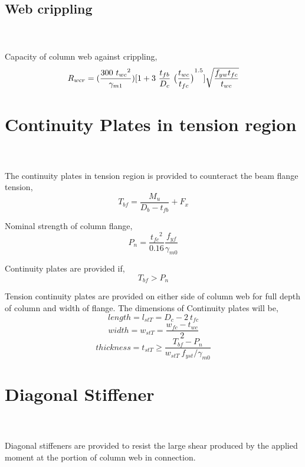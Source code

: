 \documentclass[11.5pt,a4paper,oneside]{report}
\begin{document}
\begin{Form}
\subsection{Web crippling}
\qquad {} \\ \\
\noindent
Capacity of column web against crippling,
\begin{equation}
R_{wcr} = (\frac{300~ {t_{wc}}^2}{\gamma_{m1}})
[1+3~\frac{t_{fb}}{D_c} ~ {\big{(}\frac{t_{wc}}{t_{fc}}\big{)}}^{1.5}]
\sqrt{\frac{f_{yw} t_{fc}}{t_{wc}}}
\end{equation}



\section{Continuity Plates in tension region}
\qquad {} \\ \\
\noindent
The continuity plates in tension region is provided to counteract the beam flange tension, 
\begin{equation}
T_{bf} = \frac{M_u}{D_b - t_{fb}} + F_x
\end{equation}

\noindent
Nominal strength of column flange, 
\begin{equation}
P_n = \frac{{t_{fc}}^2}{0.16} \frac{f_{yf}}{\gamma_{m0}}	
\end{equation}

\noindent
Continuity plates are provided if,
\begin{equation}
T_{bf} >  P_n
\end{equation}

\noindent
Tension continuity plates are provided on either side of column web for full depth of column and width of flange.
The dimensions of Continuity plates will be, \\
\begin{equation}
length = l_{stT} = D_c-2~t_{fc}
\end{equation}
\begin{equation}
width = w_{stT} = \frac{w_{fc}-t_{wc}}{2}
\end{equation}
\begin{equation}
thickness = t_{stT} \ge \frac{T_{bf}-P_n}{w_{stT} ~ f_{yst}/\gamma_{m0}}
\end{equation}


\pagebreak
\section{Diagonal Stiffener}
\qquad {} \\ \\
\noindent
Diagonal stiffeners are provided to resist the large shear produced by the applied moment at the portion of column web in connection. 


\end{Form}
\end{document}
